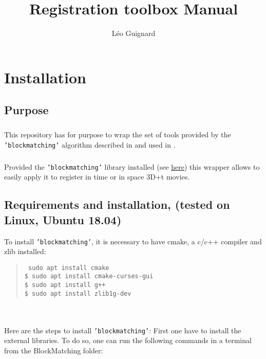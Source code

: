 \documentclass[10pt,a4paper]{book}
\author{L\'eo Guignard}
\title{Registration toolbox Manual}
\newcommand{\option}[1]{{\texttt{'#1'}}}
\newenvironment{code}[1]{\mbox{}\\[1ex]\hspace*{-#1cm}\begin{minipage}{150mm}\begin{quote}\tt}{\end{quote}\end{minipage}\mbox{}\\[1ex]}
\begin{document}
\maketitle
\tableofcontents
\chapter{Installation}
\section{Purpose}
\paragraph{}This repository has for purpose to wrap the set of tools provided by the \option{blockmatching} algorithm described in \citep{Ourselin:2000aa} and used in \citep{McDole:2018aa,Guignard:2017aa,Guignard:2014aa}.
\paragraph{}Provided the \option{blockmatching} library installed (see \href{https://gitlab.inria.fr/greg/Klab-BlockMatching}{\underline{here}}) this wrapper allows to easily apply it to register in time or in space 3D+t movies.
\section{Requirements and installation, (tested on Linux, Ubuntu 18.04)}
To install \option{blockmatching}, it is necessary to have cmake, a c/c++ compiler and zlib installed:
  \begin{code}{0.8}
    \$ sudo apt install cmake \\
    \$ sudo apt install cmake-curses-gui \\
    \$ sudo apt install g++ \\
    \$ sudo apt install zlib1g-dev
  \end{code}\\
  
Here are the steps to install \option{blockmatching}:
First one have to install the external libraries. To do so, one can run the following commands in a terminal from the BlockMatching folder:\\
\end{document}
